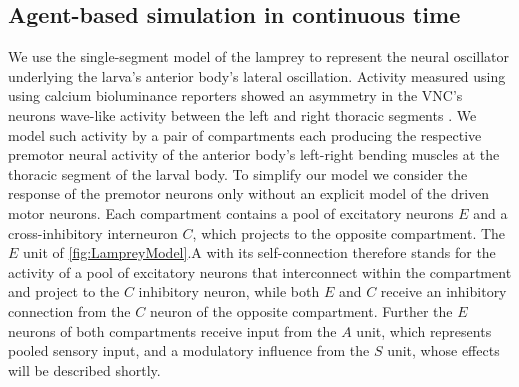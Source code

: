 \documentclass[10pt,a4paper]{article}
\begin{document}
\subsection{Agent-based simulation in continuous time}
We use the single-segment model of the lamprey \citep{lansner1997realistic} to represent the neural oscillator underlying the larva's anterior body's lateral oscillation. Activity measured using using calcium bioluminance reporters  showed an asymmetry in the VNC's neurons wave-like activity between the left and right thoracic segments \citep{berni2015genetic}. We model such activity by a pair of compartments each producing the respective premotor neural activity of the anterior  body's left-right bending muscles at the thoracic segment of the larval body. To simplify our model we consider the response of the premotor neurons only without an explicit model of the driven motor neurons. Each compartment contains a pool of excitatory neurons $E$ and a cross-inhibitory interneuron $C$, which projects to the opposite compartment. The $E$ unit of \ref{fig:LampreyModel}.A with its self-connection therefore stands for the activity of a pool of excitatory neurons that interconnect within the compartment and project to the $C$ inhibitory neuron, while both  $E$ and $C$ receive an inhibitory connection from the $C$ neuron of the opposite compartment. Further the $E$ neurons of both compartments receive input from the $A$ unit, which represents pooled sensory input, and a modulatory influence from the $S$ unit, whose effects will be described shortly.
\end{document}
